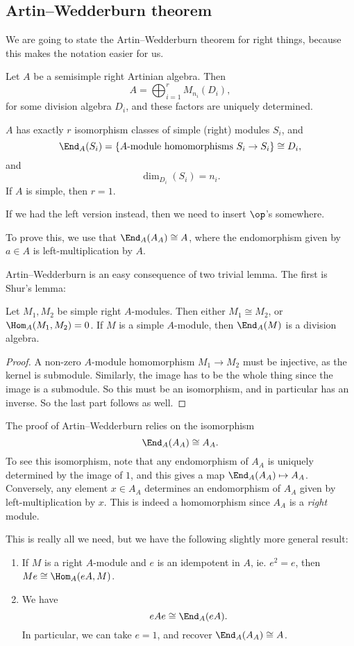 \documentclass[a4paper]{article}
\begin{document}
\subsection{Artin--Wedderburn theorem}
We are going to state the Artin--Wedderburn theorem for right things, because this makes the notation easier for us.
\begin{thm}
  Let $A$ be a semisimple right Artinian algebra. Then
  \[
    A = \bigoplus_{i = 1}^r M_{n_i}(D_i),
  \]
  for some division algebra $D_i$, and these factors are uniquely determined.

  $A$ has exactly $r$ isomorphism classes of simple (right) modules $S_i$, and
  \[
    \End_A (S_i) = \{\text{$A$-module homomorphisms $S_i \to S_i$}\} \cong D_i,
  \]
  and
  \[
    \dim_{D_i}(S_i) = n_i.
  \]
  If $A$ is simple, then $r = 1$.
\end{thm}
If we had the left version instead, then we need to insert $\op$'s somewhere.

To prove this, we use that $\End_A(A_A) \cong A$, where the endomorphism given by $a \in A$ is left-multiplication by $A$.

Artin--Wedderburn is an easy consequence of two trivial lemma. The first is Shur's lemma:
\begin{lemma}
  Let $M_1, M_2$ be simple right $A$-modules. Then either $M_1 \cong M_2$, or $\Hom_A(M_1, M_2) = 0$. If $M$ is a simple $A$-module, then $\End_A(M)$ is a division algebra.
\end{lemma}

\begin{proof}
  A non-zero $A$-module homomorphism $M_1 \to M_2$ must be injective, as the kernel is submodule. Similarly, the image has to be the whole thing since the image is a submodule. So this must be an isomorphism, and in particular has an inverse. So the last part follows as well.
\end{proof}

The proof of Artin--Wedderburn relies on the isomorphism
\[
  \End_A(A_A) \cong A_A.
\]
To see this isomorphism, note that any endomorphism of $A_A$ is uniquely determined by the image of $1$, and this gives a map $\End_A(A_A) \mapsto A_A$. Conversely, any element $x \in A_A$ determines an endomorphism of $A_A$ given by left-multiplication by $x$. This is indeed a homomorphism since $A_A$ is a \emph{right} module.

This is really all we need, but we have the following slightly more general result:
\begin{lemma}\leavevmode
  \begin{enumerate}
    \item If $M$ is a right $A$-module and $e$ is an idempotent in $A$, ie. $e^2 = e$, then $Me \cong \Hom_A(eA, M)$.
    \item We have
      \[
        eAe \cong \End_A(eA).
      \]
      In particular, we can take $e = 1$, and recover $\End_A(A_A) \cong A$.
  \end{enumerate}
\end{lemma}
\end{document}
